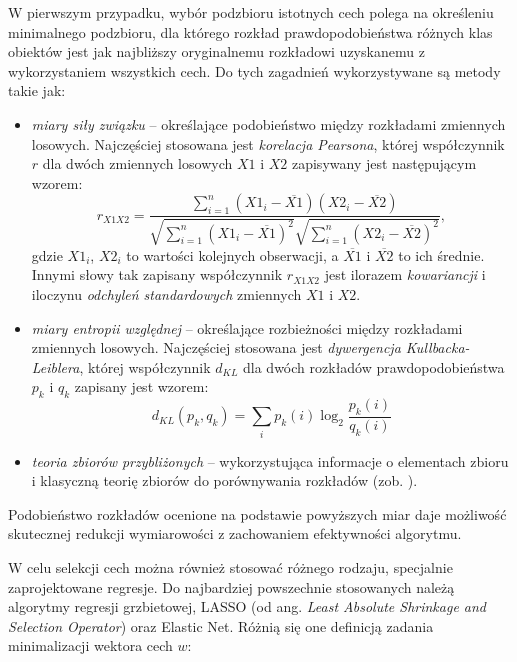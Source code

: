 W pierwszym przypadku, wybór podzbioru istotnych cech polega na określeniu minimalnego podzbioru, dla którego rozkład prawdopodobieństwa różnych klas obiektów jest jak najbliższy oryginalnemu rozkładowi uzyskanemu z wykorzystaniem wszystkich cech. Do tych zagadnień wykorzystywane są metody takie jak:
\begin{itemize}[noitemsep,nolistsep]
	\item \textit{miary siły związku} -- określające podobieństwo między rozkładami zmiennych losowych. Najczęściej stosowana jest \textit{korelacja Pearsona}, której współczynnik $r$ dla dwóch zmiennych losowych $X1$ i $X2$ zapisywany jest następującym wzorem:
	\begin{equation}
	\label{PearsorR}
	r_{X1X2} = \frac{\sum_{i=1}^n (X1_i - \overline{X1})(X2_i - \overline{X2})}{\sqrt{\sum_{i=1}^n (X1_i - \overline{X1})^2} \sqrt{\sum_{i=1}^n (X2_i - \overline{X2})^2}},
	\end{equation}
	gdzie $X1_i$, $X2_i$ to wartości kolejnych obserwacji, a $\overline{X1}$ i $\overline{X2}$ to ich średnie. Innymi słowy tak zapisany współczynnik $r_{X1X2}$ jest ilorazem \textit{kowariancji} \linebreak i iloczynu \textit{odchyleń standardowych} zmiennych $X1$ i $X2$.
	\item \textit{miary entropii względnej} --  określające rozbieżności między rozkładami zmiennych losowych. Najczęściej stosowana jest \textit{dywergencja Kullbacka-Leiblera}, której współczynnik $d_{KL}$ dla dwóch rozkładów prawdopodobieństwa $p_k$ i $q_k$ zapisany jest wzorem: 
	\begin{equation}
	d_{KL}(p_k, q_k) = \sum_{i} p_k(i) \log_2 \frac{p_k(i)}{q_k(i)}
	\end{equation}
	\item \textit{teoria zbiorów przybliżonych} -- wykorzystująca informacje o elementach zbioru i klasyczną teorię zbiorów do porównywania rozkładów (zob. \cite{Kowalik2003}).
\end{itemize}
Podobieństwo rozkładów ocenione na podstawie powyższych miar daje możliwość skutecznej redukcji wymiarowości z zachowaniem efektywności algorytmu.

W celu selekcji cech można również stosować różnego rodzaju, specjalnie zaprojektowane regresje. Do najbardziej powszechnie stosowanych należą algorytmy regresji grzbietowej, LASSO (od ang. \textit{Least Absolute Shrinkage and Selection Operator}) oraz Elastic Net. Różnią się one definicją zadania minimalizacji wektora cech $w$:

